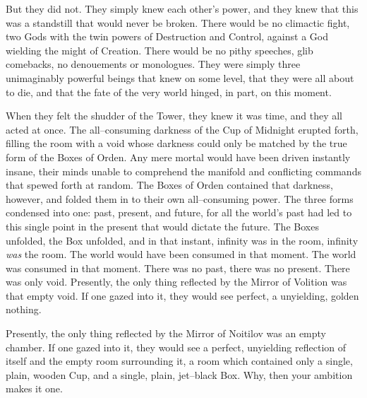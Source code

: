 But they did not. They simply knew each other’s power, and they knew that this was a standstill that would never be broken. There would be no climactic fight, two Gods with the twin powers of Destruction and Control, against a God wielding the might of Creation. There would be no pithy speeches, glib comebacks, no denouements or monologues. They were simply three unimaginably powerful beings that knew on some level, that they were all about to die, and that the fate of the very world hinged, in part, on this moment.

When they felt the shudder of the Tower, they knew it was time, and they all acted at once.
\SmallVSpace
The all\mbox{--}consuming darkness of the Cup of Midnight erupted forth, filling the room with a void whose darkness could only be matched by the true form of the Boxes of Orden. Any mere mortal would have been driven instantly insane, their minds unable to comprehend the manifold and conflicting commands that spewed forth at random.
\SmallVSpace
The Boxes of Orden contained that darkness, however, and folded them in to their own all\mbox{--}consuming power. The three forms condensed into one: past, present, and future, for all the world’s past had led to this single point in the present that would dictate the future. The Boxes unfolded, the Box unfolded, and in that instant, infinity was in the room, infinity \emph{was} the room.
\SmallVSpace
The world would have been consumed in that moment. The world was consumed in that moment. There was no past, there was no present. There was only void.
\SmallVSpace
Presently, the only thing reflected by the Mirror of Volition was that empty void. If one gazed into it, they would see perfect, a unyielding, golden nothing.

Presently, the only thing reflected by the Mirror of Noitilov was an empty chamber. If one gazed into it, they would see a perfect, unyielding reflection of itself and the empty room surrounding it, a room which contained only a single, plain, wooden Cup, and a single, plain, jet\mbox{--}black Box.
\simpleline	
{}
{Why, then your ambition makes it one.}
\simpleline	

